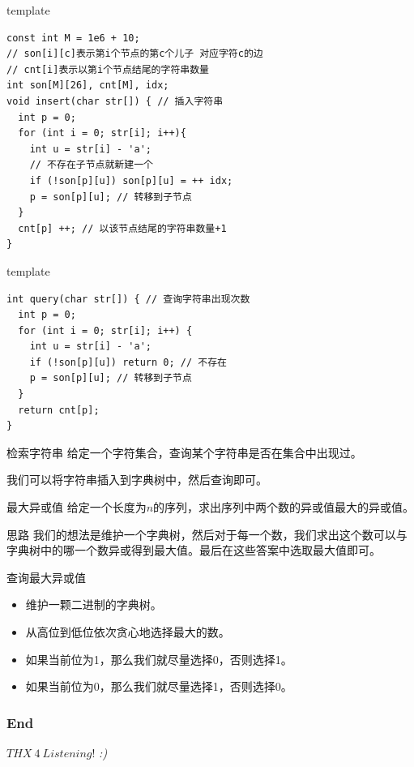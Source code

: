 \documentclass{ldr-simple-gray}
\begin{document}
  \begin{frame}[fragile]{template}
    \begin{verbatim}
const int M = 1e6 + 10;
// son[i][c]表示第i个节点的第c个儿子 对应字符c的边
// cnt[i]表示以第i个节点结尾的字符串数量
int son[M][26], cnt[M], idx;
void insert(char str[]) { // 插入字符串
  int p = 0;
  for (int i = 0; str[i]; i++){
    int u = str[i] - 'a';
    // 不存在子节点就新建一个
    if (!son[p][u]) son[p][u] = ++ idx;
    p = son[p][u]; // 转移到子节点
  }
  cnt[p] ++; // 以该节点结尾的字符串数量+1
}\end{verbatim}
  \end{frame}

  \begin{frame}[fragile]{template}
    \begin{verbatim}
int query(char str[]) { // 查询字符串出现次数
  int p = 0;
  for (int i = 0; str[i]; i++) {
    int u = str[i] - 'a';
    if (!son[p][u]) return 0; // 不存在
    p = son[p][u]; // 转移到子节点
  }
  return cnt[p];
}\end{verbatim}
  \end{frame}

  \begin{frame}{检索字符串}
    给定一个字符集合，查询某个字符串是否在集合中出现过。\newline

    我们可以将字符串插入到字典树中，然后查询即可。
  \end{frame}

  \begin{frame}{最大异或值}
    给定一个长度为$n$的序列，求出序列中两个数的异或值最大的异或值。

    \begin{block}{思路}
      我们的想法是维护一个字典树，然后对于每一个数，我们求出这个数可以与字典树中的哪一个数异或得到最大值。最后在这些答案中选取最大值即可。
    \end{block}

    \begin{block}{查询最大异或值}
      \begin{itemize}
        \item 维护一颗二进制的字典树。
        \item 从高位到低位依次贪心地选择最大的数。
        \item 如果当前位为1，那么我们就尽量选择0，否则选择1。
        \item 如果当前位为0，那么我们就尽量选择1，否则选择0。
      \end{itemize}
    \end{block}
  \end{frame}

  \begin{frame} %
    \frametitle{End}
    \begin{center}
      \Huge{$THX\ 4\ Listening!$}
      \emph{:)}
    \end{center}
  \end{frame}
\end{document}
